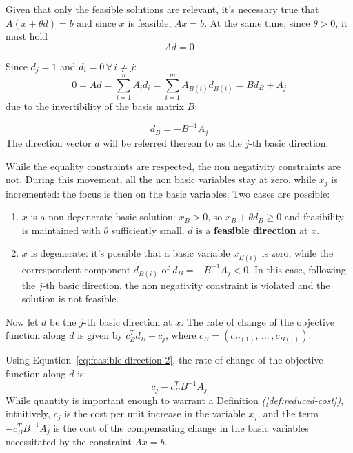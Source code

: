 \documentclass[english]{article}
\begin{document}
Given that only the feasible solutions are relevant, it's necessary true that \(A \left( x + \theta d \right) = b\) and since \(x\) is feasible, \(A x = b\).
At the same time, since \(\theta > 0\), it must hold
\begin{equation}
  A d = 0
  \label{eq:feasible-direction-1}
\end{equation}

Since \(d_j = 1\) and \(d_i = 0 \, \forall \, i \neq j\):
\[ 0 = Ad = \displaystyle \sum_{i=1}^n A_i d_i = \sum_{i=1}^{m} A_{B(i)} d_{B(i)} = B d_B + A_j \]
due to the invertibility of the basis matrix \(B\):

\begin{equation}
  d_B = - B^{-1} A_j
  \label{eq:feasible-direction-2}
\end{equation}
The direction vector \(d\) will be referred thereon to as the \(j\)-th basic direction.

While the equality constraints are respected, the non negativity constraints are not.
During this movement, all the non basic variables stay at zero, while \(x_j\) is incremented: the focus is then on the basic variables.
Two cases are possible:

\begin{enumerate}[label=\arabic*., ref=(\arabic*)]
  \item \(x\) is a non degenerate basic solution: \(x_B > 0\), so \(x_B + \theta d_B \geq 0\) and feasibility is maintained with \(\theta\) sufficiently small. \(d\) is a \textbf{feasible direction} at \(x\).
  \item \(x\) is degenerate: it's possible that a basic variable \(x_{B(i)}\) is zero, while the correspondent component \(d_{B(i)}\) of \(d_{B} = -B^{-1}A_j < 0\). In this case, following the \(j\)-th basic direction, the non negativity constraint is violated and the solution is not feasible.
\end{enumerate}

\bigskip
Now let \(d\) be the \(j\)-th basic direction at \(x\).
The rate of change of the objective function along \(d\) is given by \(c^T_B d_B + c_j\), where \(c_B = \left( c_{B(1)}, \, \ldots \,, c_{B(,)} \right)\).

Using Equation~\ref{eq:feasible-direction-2}, the rate of change of the objective function along \(d\) is:
\[ c_j - c^T_B B^{-1} A_j \]
While quantity is important enough to warrant a Definition \textit{(\ref{def:reduced-cost})},
intuitively, \(c_j\) is the cost per unit increase in the variable \(x_j\), and the term \(-c^T_B B^{-1} A_j\) is the cost of the compensating change in the basic variables necessitated by the constraint \(Ax = b\).
\end{document}
